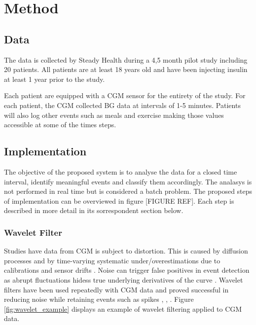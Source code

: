 \chapter{Method}

\section{Data}

The data is collected by Steady Health during a 4,5 month pilot study including 20 patients.
All patients are at least 18 years old and have been injecting insulin at least 1 year prior to the study.

Each patient are equipped with a CGM sensor for the entirety of the study.
For each patient, the CGM collected BG data at intervals of 1-5 minutes.
Patients will also log other events such as meals and exercise making those values accessible at some of the times steps.



\section{Implementation}

The objective of the proposed system is to analyse the data for a closed time interval, identify meaningful events and classify them accordingly.
The analasys is not performed in real time but is considered a batch problem.
The proposed steps of implementation can be overviewed in figure [FIGURE REF].
Each step is described in more detail in its sorrespondent section below.

\subsection{Wavelet Filter}

Studies have data from CGM is subject to distortion.
This is caused by diffusion processes and by time-varying systematic under/overestimations due to calibrations and sensor drifts \parencite{facchinetti2014modeling}.
Noise can trigger false positives in event detection as abrupt fluctuations hidess true underlying derivatives of the curve \parencite{Facchinetti2016}.
Wavelet filters have been used repeatedly with CGM data and proved successful in reducing noise while retaining events such as spikes \parencite{Mag2016}, \parencite{Facchinetti2016}, \parencite{samadi2017}.
Figure \ref{fig:wavelet_example} displays an example of wavelet filtering applied to CGM data.


